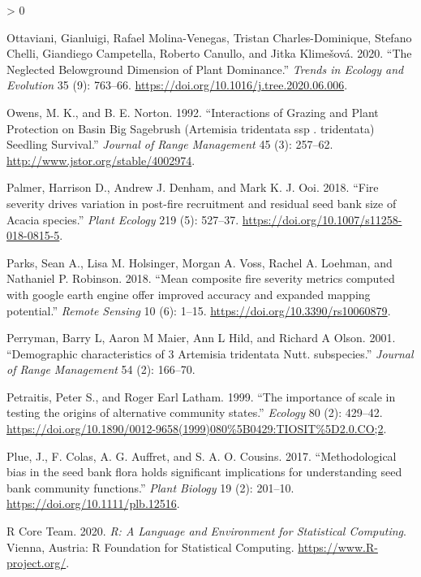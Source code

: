 \documentclass[
  12pt,
]{article}
\newlength{\cslhangindent}
\newenvironment{CSLReferences}[2] %
 {%
  \setlength{\parindent}{0pt}
  \ifodd #1 \everypar{\setlength{\hangindent}{\cslhangindent}}\ignorespaces\fi
  \ifnum #2 > 0
  \setlength{\parskip}{#2\baselineskip}
  \fi
 }%
 {}
\begin{document}
\begin{CSLReferences}{1}{0}
\leavevmode\hypertarget{ref-Ottaviani2020}{}%
Ottaviani, Gianluigi, Rafael Molina-Venegas, Tristan Charles-Dominique,
Stefano Chelli, Giandiego Campetella, Roberto Canullo, and Jitka
Klimešová. 2020. {``{The Neglected Belowground Dimension of Plant
Dominance}.''} \emph{Trends in Ecology and Evolution} 35 (9): 763--66.
\url{https://doi.org/10.1016/j.tree.2020.06.006}.

\leavevmode\hypertarget{ref-Owens1992}{}%
Owens, M. K., and B. E. Norton. 1992. {``{Interactions of Grazing and
Plant Protection on Basin Big Sagebrush (Artemisia tridentata ssp .
tridentata) Seedling Survival}.''} \emph{Journal of Range Management} 45
(3): 257--62. \url{http://www.jstor.org/stable/4002974}.

\leavevmode\hypertarget{ref-Palmer2018}{}%
Palmer, Harrison D., Andrew J. Denham, and Mark K. J. Ooi. 2018.
{``{Fire severity drives variation in post-fire recruitment and residual
seed bank size of Acacia species}.''} \emph{Plant Ecology} 219 (5):
527--37. \url{https://doi.org/10.1007/s11258-018-0815-5}.

\leavevmode\hypertarget{ref-Parks2018}{}%
Parks, Sean A., Lisa M. Holsinger, Morgan A. Voss, Rachel A. Loehman,
and Nathaniel P. Robinson. 2018. {``{Mean composite fire severity
metrics computed with google earth engine offer improved accuracy and
expanded mapping potential}.''} \emph{Remote Sensing} 10 (6): 1--15.
\url{https://doi.org/10.3390/rs10060879}.

\leavevmode\hypertarget{ref-Perryman2001}{}%
Perryman, Barry L, Aaron M Maier, Ann L Hild, and Richard A Olson. 2001.
{``{Demographic characteristics of 3 Artemisia tridentata Nutt.
subspecies}.''} \emph{Journal of Range Management} 54 (2): 166--70.

\leavevmode\hypertarget{ref-Petraitis1999}{}%
Petraitis, Peter S., and Roger Earl Latham. 1999. {``{The importance of
scale in testing the origins of alternative community states}.''}
\emph{Ecology} 80 (2): 429--42.
\url{https://doi.org/10.1890/0012-9658(1999)080\%5B0429:TIOSIT\%5D2.0.CO;2}.

\leavevmode\hypertarget{ref-Plue2017}{}%
Plue, J., F. Colas, A. G. Auffret, and S. A. O. Cousins. 2017.
{``{Methodological bias in the seed bank flora holds significant
implications for understanding seed bank community functions}.''}
\emph{Plant Biology} 19 (2): 201--10.
\url{https://doi.org/10.1111/plb.12516}.

\leavevmode\hypertarget{ref-R}{}%
R Core Team. 2020. \emph{R: A Language and Environment for Statistical
Computing}. Vienna, Austria: R Foundation for Statistical Computing.
\url{https://www.R-project.org/}.


\end{CSLReferences}
\end{document}
